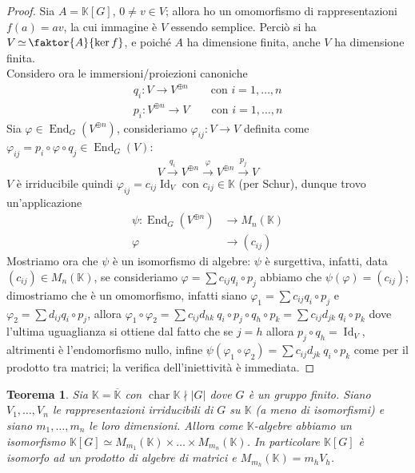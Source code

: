 \documentclass[11pt]{article}
\theoremstyle{plain}
\newtheorem{thm}{Teorema}[section]
\theoremstyle{definition}
\theoremstyle{remark}
\newcommand{\K}{\mathbb{K}}
\DeclareMathOperator{\End}{End}
\DeclareMathOperator{\Id}{Id}
\DeclareMathOperator{\Char}{char}
\DeclareMathOperator{\iso}{\simeq}
\begin{document}
\begin{proof}
	Sia $A=\K[G]$, $0\neq v\in V$; allora ho un omomorfismo di rappresentazioni $f(a)=av$, la cui immagine è $V$ essendo semplice. Perciò si ha $V\iso\faktor{A}{\ker f}$, e poiché $A$ ha dimensione finita, anche $V$ ha dimensione finita.\\
	Considero ora le immersioni/proiezioni canoniche
	\begin{align*}
		q_i:V\to V^{\oplus n}\qquad \text{con }i=1,\ldots,n\\
		p_i:V^{\oplus n}\to V\qquad \text{con }i=1,\ldots,n
	\end{align*}
	Sia $\varphi\in \End_G(V^{\oplus n})$, consideriamo $\varphi_{ij}:V\to V$ definita come $\varphi_{ij} = p_i\circ\varphi\circ q_j\in\End_G(V)$:
	\[
		V \xrightarrow{q_i} V^{\oplus n} \xrightarrow{\varphi} V^{\oplus n} \xrightarrow{p_j} V
	\]
	$V$ è irriducibile quindi $\varphi_{ij} = c_{ij}\Id_V$ con $c_{ij}\in \K$ (per Schur), dunque trovo un'applicazione
	\begin{align*}
		\psi:\End_G(V^{\oplus n})&\to M_n(\K)\\
		\varphi&\to (c_{ij})
	\end{align*}
	Mostriamo ora che $\psi$ è un isomorfismo di algebre: $\psi$ è surgettiva, infatti, data $(c_{ij})\in M_n(\K)$, se consideriamo $\varphi = \sum c_{ij} q_i\circ p_j$ abbiamo che $\psi(\varphi) = (c_{ij})$; dimostriamo che è un omomorfismo, infatti siano $\varphi_1 = \sum c_{ij} q_i\circ p_j$ e $\varphi_2 = \sum d_{ij} q_i\circ p_j$, allora $\varphi_1\circ\varphi_2 = \sum c_{ij} d_{hk}\ q_i\circ p_j\circ q_h\circ p_k = \sum c_{ij}d_{jk}\ q_i\circ p_k$ dove l'ultima uguaglianza si ottiene dal fatto che se $j=h$ allora $p_j\circ q_h=\Id_V$, altrimenti è l'endomorfismo nullo, infine $\psi(\varphi_1\circ \varphi_2) = \sum c_{ij}d_{jk}\  q_i\circ p_k$ come per il prodotto tra matrici; la verifica dell'iniettività è immediata.
\end{proof}

\begin{thm}
	Sia $\K=\overline{\K}$ con $\Char \K \nmid |G|$ dove $G$ è un gruppo finito. Siano $V_1,\ldots,V_n$ le rappresentazioni irriducibili di $G$ su $\K$ (a meno di isomorfismi) e siano $m_1,\ldots,m_n$ le loro dimensioni. Allora come $\K$-algebre abbiamo un isomorfismo $\K[G] \iso M_{m_1}(\K)\times\ldots\times M_{m_n}(\K)$. In particolare $\K[G]$ è isomorfo ad un prodotto di algebre di matrici e $M_{m_h}(\K) = m_hV_h$.
\end{thm}
\end{document}
